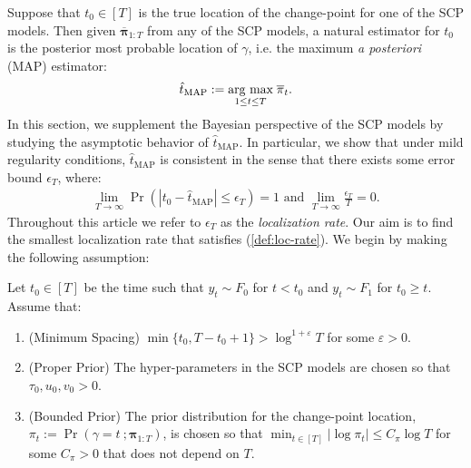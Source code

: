 Suppose that $t_0 \in [T]$ is the true location of the change-point for one of the SCP models. Then given $\overline{\boldsymbol{\pi}}_{1:T}$ from any of the SCP models, a natural estimator for $t_0$ is the posterior most probable location of $\gamma$, i.e. the maximum \textit{a posteriori} (MAP) estimator:
\begin{align}\label{eq:map}
    \hat{t}_{\text{MAP}} := \underset{1 \leq t \leq T}{\text{\normalfont arg max}} \; \overline{\pi}_t.
\end{align}
In this section, we supplement the Bayesian perspective of the SCP models by studying the asymptotic behavior of $\hat{t}_{\text{MAP}}$. In particular, we show that under mild regularity conditions, $\hat{t}_{\text{MAP}}$ is consistent in the sense that there exists some error bound $\epsilon_T$, where:
\begin{align}
    \lim_{T\to\infty} \Pr\left(|t_0 - \hat{t}_{\text{MAP}}| \leq \epsilon_T\right) = 1 \text{ and } \lim_{T\to\infty} \frac{\epsilon_T}{T} = 0. \label{def:loc-rate}
\end{align}
Throughout this article we refer to $\epsilon_T$ as the \textit{localization rate}. Our aim is to find the smallest localization rate that satisfies (\ref{def:loc-rate}). We begin by making the following assumption:
\begin{assumption}\label{assumption:1}
    Let $t_0 \in [T]$ be the time such that $y_t \sim F_0$ for $t < t_0$ and $y_t \sim F_1$ for $t_0 \geq t$. Assume that: \vspace{-10pt}
    \begin{enumerate}[label=(\roman*)]
        \item (Minimum Spacing) $\min\{t_0,T-t_0 + 1\} > \log^{1+\varepsilon} T$ for some $\varepsilon > 0$. 
        \item (Proper Prior) The hyper-parameters in the SCP models are chosen so that $\tau_0, u_0, v_0 > 0$.
        \item (Bounded Prior) The prior distribution for the change-point location, $\pi_t := \Pr(\gamma = t \:; \boldsymbol{\pi}_{1:T})$, is chosen so that $\min_{t\in[T]} |\log \pi_{t}| \leq C_\pi \log T$ for some $C_\pi > 0$ that does not depend on $T$.
    \end{enumerate}
\end{assumption}
\vspace{-10pt}

